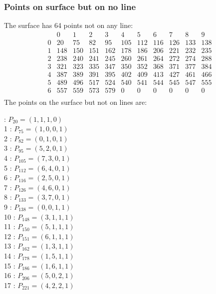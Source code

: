 \documentclass{article}
\begin{document}
{\subsubsection*{Points on surface but on no line}
The surface has 64 points not on any line:\\
$$
\begin{array}{r|*{10}{r}}
 & 0 & 1 & 2 & 3 & 4 & 5 & 6 & 7 & 8 & 9\\
\hline
0 & 20 & 75 & 82 & 95 & 105 & 112 & 116 & 126 & 133 & 138\\
1 & 148 & 150 & 151 & 162 & 178 & 186 & 206 & 221 & 232 & 235\\
2 & 238 & 240 & 241 & 245 & 260 & 261 & 264 & 272 & 274 & 288\\
3 & 321 & 323 & 335 & 347 & 350 & 352 & 368 & 371 & 377 & 384\\
4 & 387 & 389 & 391 & 395 & 402 & 409 & 413 & 427 & 461 & 466\\
5 & 489 & 496 & 517 & 524 & 540 & 541 & 544 & 545 & 547 & 555\\
6 & 557 & 559 & 573 & 579 & 0 & 0 & 0 & 0 & 0 & 0\\
\end{array}
$$
The points on the surface but not on lines are:\\
\begin{multicols}{2}
 : $P_{20}=( 1, 1, 1, 0 )$\\
1 : $P_{75}=( 1, 0, 0, 1 )$\\
2 : $P_{82}=( 0, 1, 0, 1 )$\\
3 : $P_{95}=( 5, 2, 0, 1 )$\\
4 : $P_{105}=( 7, 3, 0, 1 )$\\
5 : $P_{112}=( 6, 4, 0, 1 )$\\
6 : $P_{116}=( 2, 5, 0, 1 )$\\
7 : $P_{126}=( 4, 6, 0, 1 )$\\
8 : $P_{133}=( 3, 7, 0, 1 )$\\
9 : $P_{138}=( 0, 0, 1, 1 )$\\
10 : $P_{148}=( 3, 1, 1, 1 )$\\
11 : $P_{150}=( 5, 1, 1, 1 )$\\
12 : $P_{151}=( 6, 1, 1, 1 )$\\
13 : $P_{162}=( 1, 3, 1, 1 )$\\
14 : $P_{178}=( 1, 5, 1, 1 )$\\
15 : $P_{186}=( 1, 6, 1, 1 )$\\
16 : $P_{206}=( 5, 0, 2, 1 )$\\
17 : $P_{221}=( 4, 2, 2, 1 )$\\

\end{multicols}}
\end{document}
